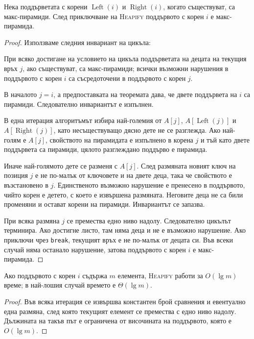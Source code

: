 \begin{thm}
Нека поддърветата с корени $\operatorname{Left}(i)$ и $\operatorname{Right}(i)$, когато съществуват, са макс-пирамиди. След приключване на \textsc{Heapify} поддървото с корен $i$ е макс-пирамида.
\end{thm}

\begin{proof}
Използваме следния инвариант на цикъла:

\medskip

\noindent При всяко достигане на условието на цикъла поддърветата на децата на текущия връх $j$, ако съществуват, са макс-пирамиди; всички възможни нарушения в поддървото с корен $i$ са съсредоточени в поддървото с корен $j$.

\medskip

В началото $j=i$, а предпоставката на теоремата дава, че двете поддървета на $i$ са пирамиди. Следователно инвариантът е изпълнен.

В една итерация алгоритъмът избира най-големия от $A[j]$, $A[\operatorname{Left}(j)]$ и $A[\operatorname{Right}(j)]$, като несъществуващо дясно дете не се разглежда. Ако най-голям е $A[j]$, свойството на пирамидата е изпълнено в корена $j$ и тъй като двете поддървета са пирамиди, цялото разглеждано поддърво е пирамида.

Иначе най-голямото дете се разменя с $A[j]$. След размяната новият ключ на позиция $j$ е не по-малък от ключовете и на двете деца, така че свойството е възстановено в $j$. Единственото възможно нарушение е пренесено в поддървото, чийто корен е детето, с което е извършена размяната. Неговите деца не са били променяни и остават корени на пирамиди. Инвариантът се запазва.

При всяка размяна $j$ се премества едно ниво надолу. Следователно цикълът терминира. Ако достигне листо, там няма деца и не е възможно нарушение. Ако приключи чрез \texttt{break}, текущият връх е не по-малък от децата си. Във всеки случай няма останало нарушение, затова поддървото с корен $i$ е макс-пирамида.
\end{proof}

\begin{prop}
Ако поддървото с корен $i$ съдържа $m$ елемента, \textsc{Heapify} работи за $O(\lg m)$ време; в най-лошия случай времето е $\Theta(\lg m)$.
\end{prop}

\begin{proof}
Във всяка итерация се извършва константен брой сравнения и евентуално една размяна, след която текущият елемент се премества с едно ниво надолу. Дължината на такъв път е ограничена от височината на поддървото, която е $O(\lg m)$.
\end{proof}

